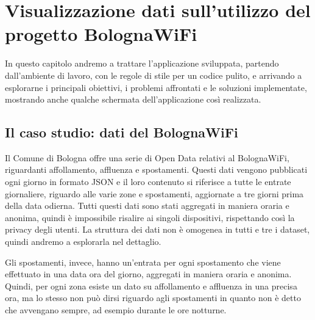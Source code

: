 \clearpage{\pagestyle{empty}\cleardoublepage}
\chapter{Visualizzazione dati sull'utilizzo del progetto BolognaWiFi}
In questo capitolo andremo a trattare l'applicazione sviluppata, partendo dall'ambiente di lavoro, con le regole di stile per un codice pulito, e arrivando a esplorarne i principali obiettivi, i problemi affrontati e le soluzioni implementate, mostrando anche qualche schermata dell'applicazione così realizzata.

\section{Il caso studio: dati del BolognaWiFi}
Il Comune di Bologna offre una serie di Open Data relativi al BolognaWiFi, riguardanti affollamento, affluenza e spostamenti. Questi dati vengono pubblicati ogni giorno in formato JSON e il loro contenuto si riferisce a tutte le entrate giornaliere, riguardo alle varie zone e spostamenti, aggiornate a tre giorni prima della data odierna. Tutti questi dati sono stati aggregati in maniera oraria e anonima, quindi è impossibile risalire ai singoli dispositivi, rispettando così la privacy degli utenti. La struttura dei dati non è omogenea in tutti e tre i dataset, quindi andremo a esplorarla nel dettaglio.


Gli spostamenti, invece, hanno un'entrata per ogni spostamento che viene effettuato in una data ora del giorno, aggregati in maniera oraria e anonima. Quindi, per ogni zona esiste un dato su affollamento e affluenza in una precisa ora, ma lo stesso non può dirsi riguardo agli spostamenti in quanto non è detto che avvengano sempre, ad esempio durante le ore notturne.

